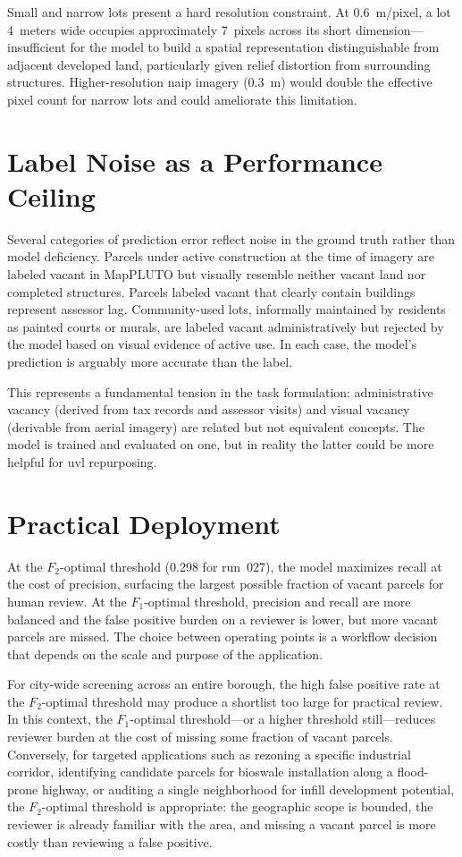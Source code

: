 Small and narrow lots present a hard resolution constraint. At 0.6~m/pixel, a lot 4~meters wide occupies approximately 7~pixels across its short dimension---insufficient for the model to build a spatial representation distinguishable from adjacent developed land, particularly given relief distortion from surrounding structures. Higher-resolution \acrshort{naip} imagery (0.3~m) would double the effective pixel count for narrow lots and could ameliorate this limitation.

\section{Label Noise as a Performance Ceiling}
\label{sec:label_noise_ceiling}

Several categories of prediction error reflect noise in the ground truth rather than model deficiency. Parcels under active construction at the time of imagery are labeled vacant in MapPLUTO but visually resemble neither vacant land nor completed structures. Parcels labeled vacant that clearly contain buildings represent assessor lag. Community-used lots, informally maintained by residents as painted courts or murals, are labeled vacant administratively but rejected by the model based on visual evidence of active use. In each case, the model's prediction is arguably more accurate than the label.

This represents a fundamental tension in the task formulation: administrative vacancy (derived from tax records and assessor visits) and visual vacancy (derivable from aerial imagery) are related but not equivalent concepts. The model is trained and evaluated on one, but in reality the latter could be more helpful for \acrshort{uvl} repurposing.

\section{Practical Deployment}
\label{sec:deployment}

At the $F_2$-optimal threshold (0.298 for run~027), the model maximizes recall at the cost of precision, surfacing the largest possible fraction of vacant parcels for human review. At the $F_1$-optimal threshold, precision and recall are more balanced and the false positive burden on a reviewer is lower, but more vacant parcels are missed. The choice between operating points is a workflow decision that depends on the scale and purpose of the application.

For city-wide screening across an entire borough, the high false positive rate at the $F_2$-optimal threshold may produce a shortlist too large for practical review. In this context, the $F_1$-optimal threshold---or a higher threshold still---reduces reviewer burden at the cost of missing some fraction of vacant parcels. Conversely, for targeted applications such as rezoning a specific industrial corridor, identifying candidate parcels for bioswale installation along a flood-prone highway, or auditing a single neighborhood for infill development potential, the $F_2$-optimal threshold is appropriate: the geographic scope is bounded, the reviewer is already familiar with the area, and missing a vacant parcel is more costly than reviewing a false positive.

